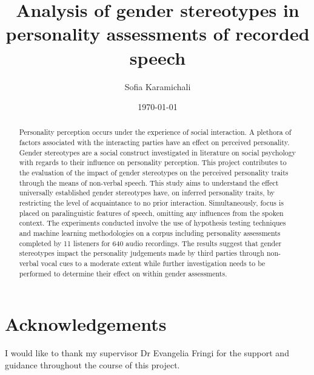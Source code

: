 \documentclass{l4proj}
\begin{document}
\title{Analysis of gender stereotypes in personality assessments of recorded speech} %
\author{Sofia Karamichali}
\date{\today}

\maketitle

\begin{abstract}
    Personality perception occurs under the experience of social interaction. A plethora of factors associated with the interacting parties have an effect on perceived personality. Gender stereotypes are a social construct investigated in literature on social psychology with regards to their influence on personality perception. This project contributes to the evaluation of the impact of gender stereotypes on the perceived personality traits through the means of non-verbal speech. This study aims to understand the effect universally established gender stereotypes have, on inferred personality traits, by restricting the level of acquaintance to no prior interaction. 
    Simultaneously, focus is placed on paralinguistic features of speech, omitting any influences from the spoken context.
    The experiments conducted involve the use of hypothesis testing techniques and machine learning methodologies on a corpus including personality assessments completed by 11 listeners for 640 audio recordings. The results suggest that gender stereotypes impact the personality judgements made by third parties through non-verbal vocal cues to a moderate extent while further investigation needs to be performed to determine their effect on within gender assessments.
    
\end{abstract}

\chapter*{Acknowledgements}
I would like to thank my supervisor Dr Evangelia Fringi for the support and guidance throughout the course of this project.
%
%
\end{document}
